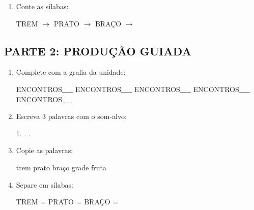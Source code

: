 \begin{exercicio}
\begin{enumerate}
  \item Conte as sílabas:
  \begin{center}
  TREM $\rightarrow$ \underline{\hspace{0.9cm}} \quad PRATO $\rightarrow$ \underline{\hspace{0.9cm}} \quad BRAÇO $\rightarrow$ \underline{\hspace{0.9cm}}
  \end{center}

\end{enumerate}

\subsection*{PARTE 2: PRODUÇÃO GUIADA}

\begin{enumerate}[resume]

  \item Complete com a grafia da unidade:
  \begin{center}
  ENCONTROS\underline{~~~} \quad ENCONTROS\underline{~~~} \quad ENCONTROS\underline{~~~} \quad ENCONTROS\underline{~~~} \quad ENCONTROS\underline{~~~}
  \end{center}

  \item Escreva 3 palavras com o som-alvo:
  \begin{center}
  1. \underline{\hspace{3cm}} . \underline{\hspace{3cm}} . \underline{\hspace{3cm}}
  \end{center}

  \item Copie as palavras:
  \begin{center}
  trem \quad prato \quad braço \quad grade \quad fruta
  \end{center}

  \item Separe em sílabas:
  \begin{center}
  TREM = \underline{\hspace{1cm}} \underline{\hspace{1cm}} \quad PRATO = \underline{\hspace{1cm}} \underline{\hspace{1cm}} \quad BRAÇO = \underline{\hspace{1cm}} \underline{\hspace{1cm}}
  \end{center}


\end{enumerate}
\end{exercicio}
